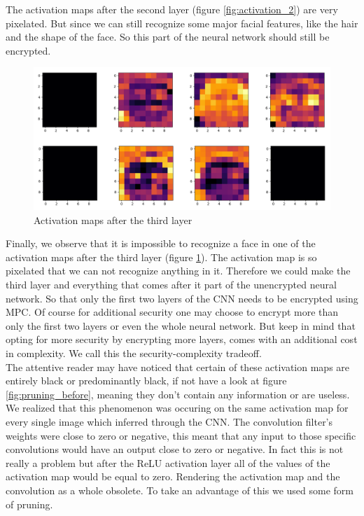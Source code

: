 The activation maps after the second layer (figure \ref{fig:activation_2}) are very pixelated. But since we can still recognize some major facial features, like the hair and the shape of the face. So this part of the neural network should still be encrypted.

\begin{figure}[H]
  \includegraphics[scale=0.4]{fig/activations/7_3.png}
  \centering
  \caption{Activation maps after the third layer}
  \label{fig:activation_3}
\end{figure}

Finally, we observe that it is impossible to recognize a face in one of the activation maps after the third layer (figure \ref{fig:activation_3}). The activation map is so pixelated that we can not recognize anything in it. Therefore we could make the third layer and everything that comes after it part of the unencrypted neural network. So that only the first two layers of the CNN needs to be encrypted using MPC. Of course for additional security one may choose to encrypt more than only the first two layers or even the whole neural network. But keep in mind that opting for more security by encrypting more layers, comes with an additional cost in complexity. We call this the security-complexity tradeoff.\\

The attentive reader may have noticed that certain of these activation maps are entirely black or predominantly black, if not have a look at figure \ref{fig:pruning_before}, meaning they don't contain any information or are useless. We realized that this phenomenon was occuring on the same activation map for every single image which inferred through the CNN. The convolution filter's weights were close to zero or negative, this meant that any input to those specific convolutions would have an output close to zero or negative. In fact this is not really a problem but after the ReLU activation layer all of the values of the activation map would be equal to zero. Rendering the activation map and the convolution as a whole obsolete. To take an advantage of this we used some form of pruning.

